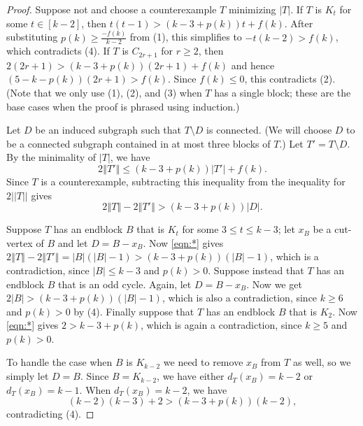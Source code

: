 \documentclass[12pt]{article}
\theoremstyle{plain}
\theoremstyle{definition}
\theoremstyle{remark}
\newcommand{\set}[1]{\left\{ #1 \right\}}
\newcommand{\card}[1]{\left|#1\right|}
\newcommand{\size}[1]{\left\Vert#1\right\Vert}
\newcommand{\irange}[1]{\left[#1\right]}
\newcommand{\parens}[1]{\left( #1 \right)}
\begin{document}
\begin{proof}
Suppose not and choose a counterexample $T$ minimizing $|T|$.  If $T$ is $K_t$
for some $t \in \irange{k-2}$, then $t(t-1) > (k-3 + p(k))t + f(k)$.
After substituting $p(k)\ge \frac{-f(k)}{k-2}$ from (1), this simplifies to
$-t(k-2)>f(k)$, 
which contradicts (4).  If $T$ is $C_{2r+1}$ for $r \ge 2$, then $2(2r+1) > (k-3 +
p(k))(2r+1) + f(k)$ and hence $(5-k-p(k))(2r+1)>f(k)$.
Since $f(k)\le 0$, this contradicts (2).  (Note that we only use (1), (2), and (3) when $T$ has a single block;
these are the base cases when the proof is phrased using induction.)

Let $D$ be an %
induced subgraph such that $T\setminus D$ is connected.  (We will choose $D$ to
be a connected subgraph contained in at most three blocks of $T$.)
Let $T' = T \setminus D$. %
By the minimality of $|T|$, we have
	\[2\size{T'} \le (k-3 + p(k))\card{T'} + f(k).\]
	Since $T$ is a counterexample, subtracting this inequality from the inequality for
$2||T||$ gives
	\begin{equation}
	2\size{T} - 2\size{T'} > (k-3 + p(k))|D|. \tag{*}\label{eqn:*}
	\end{equation}
	
Suppose $T$ has an endblock $B$ that 
is $K_t$ for some $3 \le
t \le k-3$; let $x_B$ be a cut-vertex of $B$ 
and let $D=B-x_B$.
Now \eqref{eqn:*} gives $2\size{T}-2\size{T'} =
\card{B}(\card{B}-1)>(k-3+p(k))(|B|-1)$, which 
is a contradiction, since $|B|\le k-3$ and $p(k)>0$.
Suppose instead that $T$ has an endblock $B$ that is an odd cycle.  Again, let
$D=B-x_B$.  Now we get $2|B|>(k-3+p(k))(|B|-1)$, which is also a contradiction,
since $k\ge 6$ and $p(k)>0$ by (4).
Finally suppose that $T$ has an endblock $B$ that is $K_2$. Now \eqref{eqn:*} gives
$2 > k-3 + p(k)$, which is again a contradiction, since $k \ge 5$ and $p(k) > 0$.
	
To handle the case when $B$ is $K_{k-2}$ we need to remove $x_B$ from $T$ as
well, so we simply let $D=B$.  
Since $B=K_{k-2}$, we have either $d_T(x_B) = k - 2$ or $d_T(x_B) =
k-1$. When $d_T(x_B) = k - 2$, we have
	\[(k-2)(k-3) +2 > (k-3 + p(k))(k-2),\]
	contradicting (4).
	

\end{proof}
\end{document}
